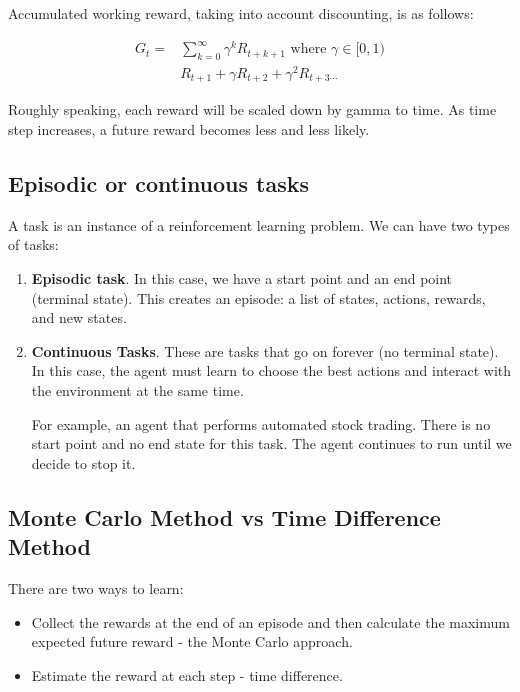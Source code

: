 \documentclass{article}
\numberwithin{equation}{subsection}
\begin{document}
Accumulated working reward, taking into account discounting, is as follows:

\begin{equation}
\begin{aligned}
G_t= & \sum_{k=0}^{\infty} \gamma^k R_{t+k+1} \text { where } \gamma \in[0,1) \\
& R_{t+1}+\gamma R_{t+2}+\gamma^2 R_{t+3 \cdots}
\end{aligned}
\end{equation}

Roughly speaking, each reward will be scaled down by gamma to time. As time step increases, a future reward becomes less and less likely.

\subsection{Episodic or continuous tasks}

A task is an instance of a reinforcement learning problem. We can have two types of tasks:

\begin{enumerate}
	\item \textbf{Episodic task}. In this case, we have a start point and an end point (terminal state). This creates an episode: a list of states, actions, rewards, and new states.
	\item \textbf{Continuous Tasks}. These are tasks that go on forever (no terminal state). In this case, the agent must learn to choose the best actions and interact with the environment at the same time.

		For example, an agent that performs automated stock trading. There is no start point and no end state for this task. The agent continues to run until we decide to stop it.
\end{enumerate}

\subsection{Monte Carlo Method vs Time Difference Method}

There are two ways to learn:
\begin{itemize}
	\item Collect the rewards at the end of an episode and then calculate the maximum expected future reward - the Monte Carlo approach.
	\item Estimate the reward at each step - time difference.
\end{itemize}
\end{document}
